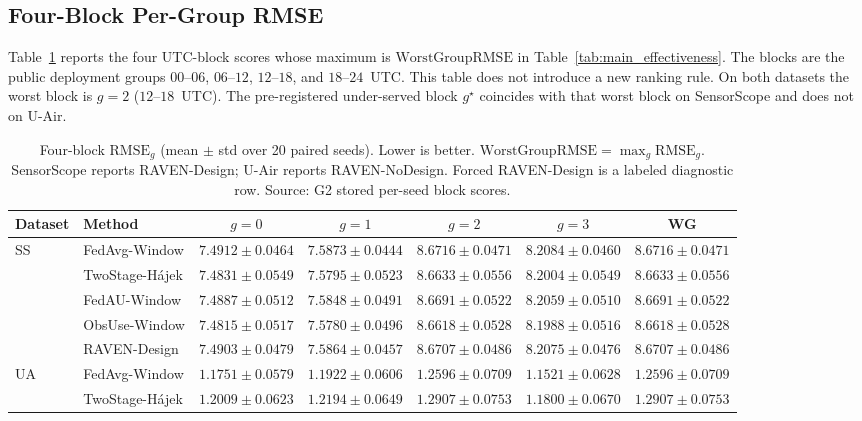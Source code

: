 \subsection{Four-Block Per-Group RMSE}
\label{app:block_rmse}

Table~\ref{tab:app_block_rmse} reports the four UTC-block scores whose
maximum is $\mathrm{WorstGroupRMSE}$ in
Table~\ref{tab:main_effectiveness}.  The blocks are the public
deployment groups $00$--$06$, $06$--$12$, $12$--$18$, and $18$--$24$~UTC.
This table does not introduce a new ranking rule.  On both datasets the
worst block is $g=2$ ($12$--$18$~UTC).  The pre-registered under-served
block $g^{\star}$ coincides with that worst block on SensorScope and
does not on U-Air.

\begin{table}[t]
\centering
\caption{Four-block $\mathrm{RMSE}_g$ (mean $\pm$ std over 20 paired
seeds).  Lower is better.  $\mathrm{WorstGroupRMSE}=\max_g\mathrm{RMSE}_g$.
SensorScope reports RAVEN-Design; U-Air reports RAVEN-NoDesign.  Forced RAVEN-Design is a labeled
diagnostic row.  Source: G2 stored per-seed block scores.}
\label{tab:app_block_rmse}
\footnotesize
\setlength{\tabcolsep}{4pt}
\begin{tabular*}{\textwidth}{@{\extracolsep{\fill}}llccccc}
\toprule
Dataset & Method & $g{=}0$ & $g{=}1$ & $g{=}2$ & $g{=}3$ & WG\\
\midrule
\multirow{5}{*}{SS}
& FedAvg-Window & $7.4912{\pm}0.0464$ & $7.5873{\pm}0.0444$ & $8.6716{\pm}0.0471$ & $8.2084{\pm}0.0460$ & $8.6716{\pm}0.0471$\\
& TwoStage-H\'ajek & $7.4831{\pm}0.0549$ & $7.5795{\pm}0.0523$ & $8.6633{\pm}0.0556$ & $8.2004{\pm}0.0549$ & $8.6633{\pm}0.0556$\\
& FedAU-Window & $7.4887{\pm}0.0512$ & $7.5848{\pm}0.0491$ & $8.6691{\pm}0.0522$ & $8.2059{\pm}0.0510$ & $8.6691{\pm}0.0522$\\
& ObsUse-Window & $7.4815{\pm}0.0517$ & $7.5780{\pm}0.0496$ & $8.6618{\pm}0.0528$ & $8.1988{\pm}0.0516$ & $8.6618{\pm}0.0528$\\
& RAVEN-Design & $7.4903{\pm}0.0479$ & $7.5864{\pm}0.0457$ & $8.6707{\pm}0.0486$ & $8.2075{\pm}0.0476$ & $8.6707{\pm}0.0486$\\
\midrule
\multirow{6}{*}{UA}
& FedAvg-Window & $1.1751{\pm}0.0579$ & $1.1922{\pm}0.0606$ & $1.2596{\pm}0.0709$ & $1.1521{\pm}0.0628$ & $1.2596{\pm}0.0709$\\
& TwoStage-H\'ajek & $1.2009{\pm}0.0623$ & $1.2194{\pm}0.0649$ & $1.2907{\pm}0.0753$ & $1.1800{\pm}0.0670$ & $1.2907{\pm}0.0753$\\

\end{tabular*}
\end{table}
